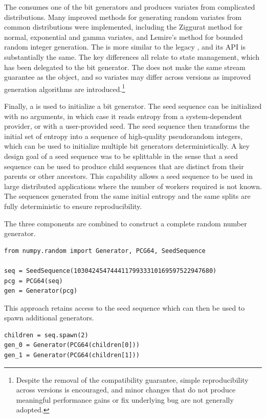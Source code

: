The  consumes one of the bit generators and produces variates
from complicated distributions. Many improved methods for generating random
variates from common distributions were implemented, including the Ziggurat
method for normal, exponential and gamma variates\cite{ziggurat}, and Lemire's
method for bounded random integer generation\cite{lemire}. The 
is more similar to the legacy , and its API is substantially
the same. The key differences all relate to state management, which has been
delegated to the bit generator. The  does not make the same
stream guarantee as the  object, and so variates may differ
across versions as improved generation algorithms are
introduced.\footnote{Despite the removal of the compatibility guarantee, simple
reproducibility across versions is encouraged, and minor changes that do not
produce meaningful performance gains or fix underlying bug are not generally
adopted.}

Finally, a  is used to initialize a bit generator. The seed
sequence can be initialized with no arguments, in which case it reads entropy
from a system-dependent provider, or with a user-provided seed. The seed
sequence then transforms the initial set of entropy into a sequence of
high-quality pseudorandom integers, which can be used to initialize multiple bit
generators deterministically. A key design goal of a seed sequence was to be
splittable in the sense that a seed sequence can be used to produce child
sequences that are distinct from their parents or other ancestors. This
capability allows a seed sequence to be used in large distributed applications
where the number of workers required is not known. The sequences generated from
the same initial entropy and the same splits are fully deterministic to ensure
reproducibility.

The three components are combined to construct a complete random number
generator.

\begin{lstlisting}
from numpy.random import Generator, PCG64, SeedSequence

seq = SeedSequence(10304245474441179933310169597522947680)
pcg = PCG64(seq)
gen = Generator(pcg)
\end{lstlisting}

\noindent This approach retains access to the seed sequence which can then be
used to spawn additional generators.

\begin{lstlisting}
children = seq.spawn(2)
gen_0 = Generator(PCG64(children[0]))
gen_1 = Generator(PCG64(children[1]))
\end{lstlisting}


